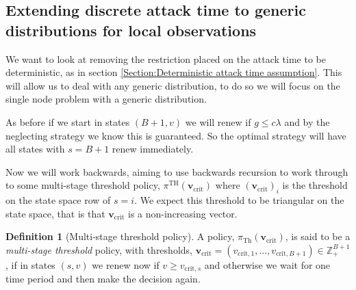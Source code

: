 \documentclass[a4paper,10pt]{article}
\theoremstyle{definition}
\newtheorem{definition}[theorem]{Definition}
\theoremstyle{definition}
\theoremstyle{remark}
\theoremstyle{definition}
\begin{document}
\subsection{Extending discrete attack time to generic distributions for local observations}
We want to look at removing the restriction placed on the attack time to be deterministic, as in section \ref{Section:Deterministic attack time assumption}. This will allow us to deal with any generic distribution, to do so we will focus on the single node problem with a generic distribution.

As before if we start in states $(B+1,v)$ we will renew if $g \leq c \lambda$ and by the neglecting strategy we know this is guaranteed. So the optimal strategy will have all states with $s=B+1$ renew immediately.

Now we will work backwards, aiming to use backwards recursion to work through to some multi-stage threshold policy, $\pi^{\text{TH}}(\bm{v}_{\text{crit}})$ where $(\bm{v}_{\text{crit}})_{i}$ is the threshold on the state space row of $s=i$. We expect this threshold to be triangular on the state space, that is that $\bm{v}_{\text{crit}}$ is a non-increasing vector.

\begin{definition}[Multi-stage threshold policy]
A policy, $\pi_{\text{Th}}(\bm{v}_{\text{crit}})$, is said to be a \textit{multi-stage threshold} policy, with thresholds, $\bm{v}_{\text{crit}}=(v_{\text{crit},1},...,v_{\text{crit},B+1}) \in \mathbb{Z}_{+}^{B+1}$, if in states $(s,v)$ we renew now if $v \geq v_{\text{crit},s}$ and otherwise we wait for one time period and then make the decision again.
\end{definition}
\end{document}
